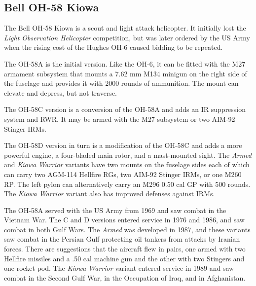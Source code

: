 

\subsection{Bell OH-58 Kiowa}

The Bell OH-58 Kiowa is a scout and light attack helicopter. It initially lost the {\itshape Light Observation Helicopter} competition, but was later ordered by the US Army when the rising cost of the Hughes OH-6 caused bidding to be repeated.

The OH-58A is the initial version. Like the OH-6, it can be fitted with the M27 armament subsystem that mounts a 7.62 mm M134 minigun on the right side of the fuselage and provides it with 2000 rounds of ammunition. The mount can elevate and depress, but not traverse.

The OH-58C version is a conversion of the OH-58A and adds an IR suppression system and RWR. It may be armed with the M27 subsystem or two AIM-92 Stinger IRMs.

The OH-58D version in turn is a modification of the OH-58C and adds a more powerful engine, a four-bladed main rotor, and a mast-mounted sight. The {\itshape Armed} and {\itshape Kiowa Warrior} variants have two mounts on the fuselage sides each of which can carry two AGM-114 Hellfire RGs, two AIM-92 Stinger IRMs, or one M260  RP. The left pylon can alternatively carry an M296 0.50 cal GP with 500 rounds. The {\itshape Kiowa Warrior} variant also has improved defenses against IRMs.

The OH-58A served with the US Army from 1969 and saw combat in the Vietnam War. The C and D versions entered service in 1976 and 1986, and saw combat in both Gulf Wars. The {\itshape Armed} was developed in 1987, and these variants saw combat in the Persian Gulf protecting oil tankers from attacks by Iranian forces. There are suggestions that the aircraft flew in pairs, one armed with two Hellfire missiles and a .50 cal machine gun and the other with two Stingers and one rocket pod. The {\itshape Kiowa Warrior} variant entered service in 1989 and saw combat in the Second Gulf War, in the Occupation of Iraq, and in Afghanistan.